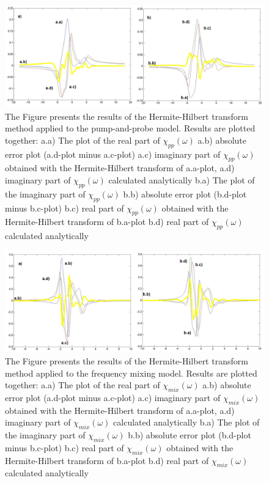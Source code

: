 \documentclass[12pt,twoside,a4paper]{article}
\numberwithin{equation}{subsection}
\numberwithin{figure}{subsection}
\begin{document}
\begin{figure} 
  \includegraphics[width=150mm]{img/hht_pnp.png}
  \caption{ The Figure presents the results of the Hermite-Hilbert transform method applied to the pump-and-probe model. Results are
  plotted together: 
     a.a) The plot of the real part of ${\chi_{pp}}(\omega )$
     a.b) absolute error plot (a.d-plot minus a.c-plot)
     a.c) imaginary part of ${\chi_{pp}}(\omega )$ obtained with the Hermite-Hilbert transform of a.a-plot, 
     a.d) imaginary part of ${\chi_{pp}}(\omega )$ calculated analytically 
     b.a) The plot of the imaginary part of ${\chi_{pp}}(\omega )$ 
     b.b) absolute error plot (b.d-plot minus b.c-plot)
     b.c) real part of ${\chi_{pp}}(\omega )$ obtained with the Hermite-Hilbert transform of b.a-plot 
     b.d) real part of $\chi_{pp} (\omega )$ calculated analytically 
     \label{fig:hht_pnp}
     }
\end{figure} 

\begin{figure} 
  \includegraphics[width=150mm]{img/hht_fmix.png}
  \caption{The Figure presents the results of the Hermite-Hilbert transform method applied to the frequency mixing model. Results are
  plotted together:
     a.a) The plot of the real part of ${\chi_{mix}}(\omega )$
     a.b) absolute error plot (a.d-plot minus a.c-plot)
     a.c) imaginary part of ${\chi_{mix}}(\omega )$ obtained with the Hermite-Hilbert transform of a.a-plot, 
     a.d) imaginary part of ${\chi_{mix}}(\omega )$ calculated analytically 
     b.a) The plot of the imaginary part of ${\chi_{mix}}(\omega )$ 
     b.b) absolute error plot (b.d-plot minus b.c-plot)
     b.c) real part of ${\chi_{mix}}(\omega )$ obtained with the Hermite-Hilbert transform of b.a-plot  
     b.d) real part of $\chi_{mix} (\omega )$ calculated analytically 
     \label{fig:hht_fmix}
     }
\end{figure}
\end{document}
